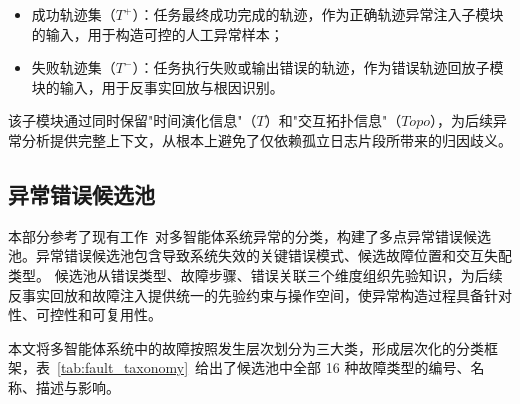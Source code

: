\begin{itemize}
  \item 成功轨迹集（${T}^{+}$）：任务最终成功完成的轨迹，作为正确轨迹异常注入子模块的输入，用于构造可控的人工异常样本；
  \item 失败轨迹集（${T}^{-}$）：任务执行失败或输出错误的轨迹，作为错误轨迹回放子模块的输入，用于反事实回放与根因识别。
\end{itemize}
 
该子模块通过同时保留"时间演化信息"（${T}$）和"交互拓扑信息"（$\mathit{Topo}$），为后续异常分析提供完整上下文，从根本上避免了仅依赖孤立日志片段所带来的归因歧义。

\subsection{异常错误候选池}

本部分参考了现有工作~\cite{cemri2025why, DBLP:journals/corr/abs-2509-23735}对多智能体系统异常的分类，构建了多点异常错误候选池。异常错误候选池包含导致系统失效的关键错误模式、候选故障位置和交互失配类型。
候选池从错误类型、故障步骤、错误关联三个维度组织先验知识，为后续反事实回放和故障注入提供统一的先验约束与操作空间，使异常构造过程具备针对性、可控性和可复用性。


本文将多智能体系统中的故障按照发生层次划分为三大类，形成层次化的分类框架，表~\ref{tab:fault_taxonomy}~给出了候选池中全部 16 种故障类型的编号、名称、描述与影响。
 
